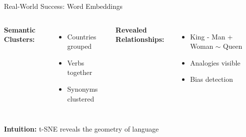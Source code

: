 \documentclass[aspectratio=169]{beamer}
\newcommand{\intuition}[1]{\colorbox{green!10}{\textcolor{intuitioncolor}{\textbf{Intuition:} #1}}}
\begin{document}
\begin{frame}{Real-World Success: Word Embeddings}
\vspace{0.2cm}
\begin{columns}
\textbf{Semantic Clusters:}
\begin{itemize}
\item Countries grouped
\item Verbs together
\item Synonyms clustered
\end{itemize}

\textbf{Revealed Relationships:}
\begin{itemize}
\item King - Man + Woman $\sim$ Queen
\item Analogies visible
\item Bias detection
\end{itemize}
\end{columns}

\vspace{0.2cm}
\intuition{t-SNE reveals the geometry of language}
\end{frame}
\end{document}
